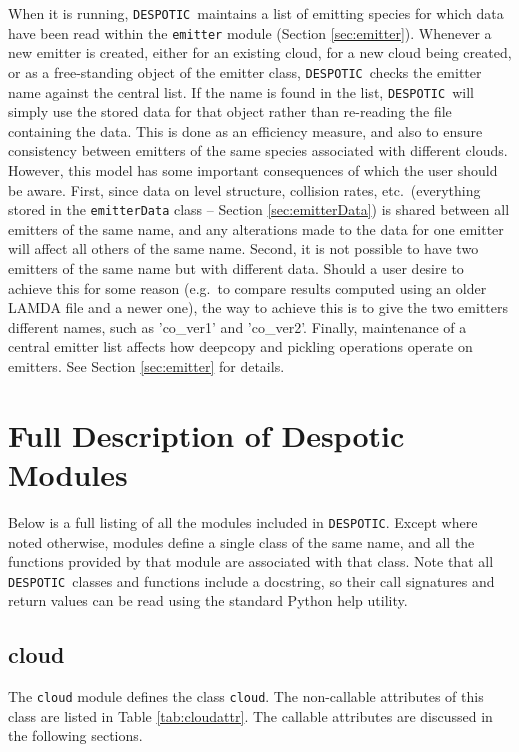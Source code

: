 \documentclass[12pt]{article}
\newcommand{\despotic}{\texttt{DESPOTIC}}
\begin{document}
When it is running, \despotic\ maintains a list of emitting species for which data have been read within the \verb=emitter= module (Section \ref{sec:emitter}). Whenever a new emitter is created, either for an existing cloud, for a new cloud being created, or as a free-standing object of the emitter class, \despotic\ checks the emitter name against the central list. If the name is found in the list, \despotic\ will simply use the stored data for that object rather than re-reading the file containing the data. This is done as an efficiency measure, and also to ensure consistency between emitters of the same species associated with different clouds. However, this model has some important consequences of which the user should be aware. First, since data on level structure, collision rates, etc.\ (everything stored in the \verb=emitterData= class -- Section \ref{sec:emitterData}) is shared between all emitters of the same name, and any alterations made to the data for one emitter will affect all others of the same name. Second, it is not possible to have two emitters of the same name but with different data. Should a user desire to achieve this for some reason (e.g.~to compare results computed using an older LAMDA file and a newer one), the way to achieve this is to give the two emitters different names, such as 'co\_ver1' and 'co\_ver2'. Finally, maintenance of a central emitter list affects how deepcopy and pickling operations operate on emitters. See Section \ref{sec:emitter} for details.

\clearpage

\section{Full Description of Despotic Modules}
\label{sec:full}

Below is a full listing of all the modules included in \despotic. Except where noted otherwise, modules define a single class of the same name, and all the functions provided by that module are associated with that class. Note that all \despotic\ classes and functions include a docstring, so their call signatures and return values can be read using the standard Python help utility.

\subsection{cloud}
\label{sec:cloud}

The \verb=cloud= module defines the class \verb=cloud=. The non-callable attributes of this class are listed in Table \ref{tab:cloudattr}. The callable attributes are discussed in the following sections.
\end{document}
